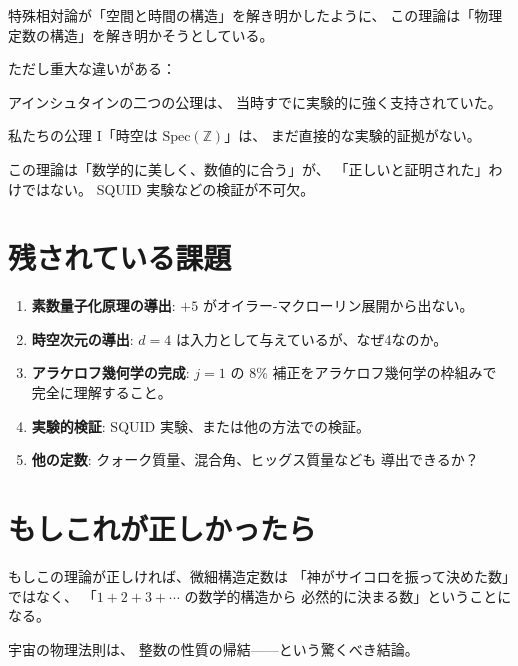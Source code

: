 \documentclass[11pt,a4paper]{article}
\begin{document}
特殊相対論が「空間と時間の構造」を解き明かしたように、
この理論は「物理定数の構造」を解き明かそうとしている。

ただし重大な違いがある：

\begin{honestbox}[重大な違い]
アインシュタインの二つの公理は、
当時すでに実験的に強く支持されていた。

私たちの公理 I「時空は $\text{Spec}(\mathbb{Z})$」は、
まだ直接的な実験的証拠がない。

この理論は「数学的に美しく、数値的に合う」が、
「正しいと証明された」わけではない。
SQUID 実験などの検証が不可欠。
\end{honestbox}

\section{残されている課題}

\begin{enumerate}
\item \textbf{素数量子化原理の導出}:
$+5$ がオイラー-マクローリン展開から出ない。

\item \textbf{時空次元の導出}:
$d = 4$ は入力として与えているが、なぜ4なのか。

\item \textbf{アラケロフ幾何学の完成}:
$j = 1$ の $8\%$ 補正をアラケロフ幾何学の枠組みで
完全に理解すること。

\item \textbf{実験的検証}:
SQUID 実験、または他の方法での検証。

\item \textbf{他の定数}:
クォーク質量、混合角、ヒッグス質量なども
導出できるか？
\end{enumerate}

\section{もしこれが正しかったら}

もしこの理論が正しければ、微細構造定数は
「神がサイコロを振って決めた数」ではなく、
「$1 + 2 + 3 + \cdots$ の数学的構造から
必然的に決まる数」ということになる。

宇宙の物理法則は、
整数の性質の帰結——という驚くべき結論。

\begin{center}
\end{center}
\end{document}

